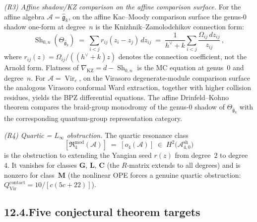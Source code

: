 \documentclass[11pt]{report}
\theoremstyle{definition}
\theoremstyle{remark}
\providecommand{\cA}{\mathcal{A}}
\providecommand{\fg}{\mathfrak{g}}
\numberwithin{equation}{section}
\begin{document}
\medskip
\noindent\emph{(R3) Affine shadow/KZ comparison on the affine comparison surface.}
For the affine algebra $\cA=\widehat{\fg}_k$, on the affine
Kac--Moody comparison surface the genus-$0$
shadow one-form at degree~$n$ is the Knizhnik--Zamolodchikov connection
form:
\[
\operatorname{Sh}_{0,n}(\Theta_{\widehat{\fg}_k})
\;=\;
\sum_{i<j}r_{ij}(z_i{-}z_j)\,dz_{ij}
\;=\;
\frac{1}{h^\vee+k}\sum_{i<j}\frac{\Omega_{ij}\,dz_{ij}}{z_{ij}}\,,
\]
where $r_{ij}(z)=\Omega_{ij}/((h^\vee{+}k)z)$ denotes the
connection coefficient, not the Arnold form.
Flatness of $\nabla_{\mathrm{KZ}}=d-\operatorname{Sh}_{0,n}$
is the MC equation at genus~$0$ and degree~$n$. For
$\cA=\operatorname{Vir}_c$, on the Virasoro degenerate-module
comparison surface the analogous Virasoro conformal Ward extraction,
together with higher collision residues, yields the
BPZ differential equations. The affine Drinfeld--Kohno theorem
compares the braid-group monodromy of the genus-$0$ shadow of
$\Theta_{\widehat{\fg}_k}$ with the corresponding quantum-group
representation category.

\medskip
\noindent\emph{(R4) Quartic = $L_\infty$ obstruction.}
The quartic resonance class
\[
[\mathfrak R^{\mathrm{mod}}_4(\cA)]
\;=\;
[o_4(\cA)]
\;\in\;
H^2\!\bigl(\cA^{\mathrm{sh}}_{4,0}\bigr)
\]
is the obstruction to extending the Yangian seed $r(z)$ from
degree~$2$ to degree~$4$. It
vanishes for classes $\mathbf{G}$, $\mathbf{L}$,
$\mathbf{C}$ (the $R$-matrix
extends to all degrees) and is nonzero for class~$\mathbf{M}$
(the nonlinear OPE forces a genuine
quartic obstruction:
$Q^{\mathrm{contact}}_{\operatorname{Vir}}=10/[c(5c+22)]$).

\subsection*{12.4.\enspace Five conjectural theorem targets}
\end{document}

